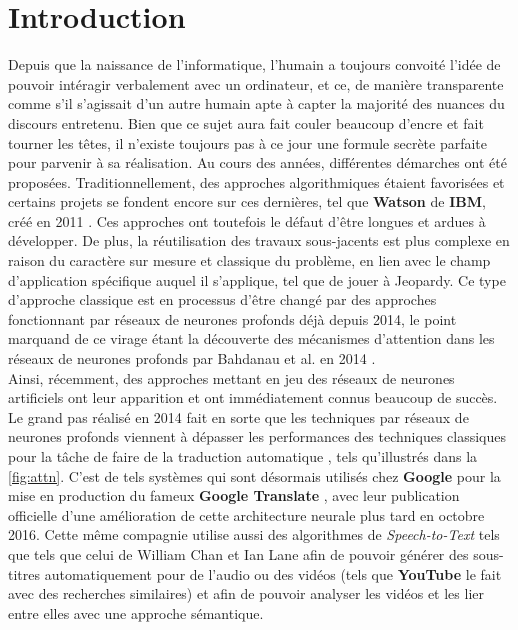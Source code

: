 \section{Introduction}

Depuis que la naissance de l'informatique, l'humain a toujours convoité l'idée de pouvoir intéragir verbalement avec un ordinateur, et ce, de manière transparente comme s'il s'agissait d'un autre humain apte à capter la majorité des nuances du discours entretenu. Bien que ce sujet aura fait couler beaucoup d'encre et fait tourner les têtes, il n'existe toujours pas à ce jour une formule secrète parfaite pour parvenir à sa réalisation. Au cours des années, différentes démarches ont été proposées. Traditionnellement, des approches algorithmiques étaient favorisées et certains projets se fondent encore sur ces dernières, tel que \textbf{Watson} de \textbf{IBM}, créé en 2011 \cite{ibmWatson}. Ces approches ont toutefois le défaut d'être longues et ardues à développer. De plus, la réutilisation des travaux sous-jacents est plus complexe en raison du caractère sur mesure et classique du problème, en lien avec le champ d'application spécifique auquel il s'applique, tel que de jouer à Jeopardy. Ce type d'approche classique est en processus d'être changé par des approches fonctionnant par réseaux de neurones profonds déjà depuis 2014, le point marquand de ce virage étant la découverte des mécanismes d'attention dans les réseaux de neurones profonds par Bahdanau et al. en 2014 \cite{attentionMechanism}.  \\

Ainsi, récemment, des approches mettant en jeu des réseaux de neurones artificiels ont leur apparition et ont immédiatement connus beaucoup de succès. Le grand pas réalisé en 2014 fait en sorte que les techniques par réseaux de neurones profonds viennent à dépasser les performances des techniques classiques pour la tâche de faire de la traduction automatique \cite{attentionMechanism}, tels qu'illustrés dans la  \autoref{fig:attn}. C’est de tels systèmes qui sont désormais utilisés chez \textbf{Google} pour la mise en production du fameux \textbf{Google Translate} \cite{googleTranslate}, avec leur publication officielle d'une amélioration de cette architecture neurale plus tard en octobre 2016. Cette même compagnie utilise aussi des algorithmes de \textit{Speech-to-Text} tels que tels que celui de William Chan et Ian Lane \cite{acousticModeling} afin de pouvoir générer des sous-titres automatiquement pour de l'audio ou des vidéos (tels que \textbf{YouTube} le fait avec des recherches similaires) et afin de pouvoir analyser les vidéos et les lier entre elles avec une approche sémantique. \\

